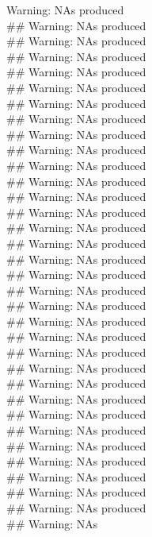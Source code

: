 \documentclass{article}\usepackage[]{graphicx}\usepackage[]{color}
\makeatletter
\newenvironment{kframe}{%
 \def\at@end@of@kframe{}%
 \ifinner\ifhmode%
  \def\at@end@of@kframe{\end{minipage}}%
  \begin{minipage}{\columnwidth}%
 \fi\fi%
 \def\FrameCommand##1{\hskip\@totalleftmargin \hskip-\fboxsep
 \colorbox{shadecolor}{##1}\hskip-\fboxsep
     \hskip-\linewidth \hskip-\@totalleftmargin \hskip\columnwidth}%
 \MakeFramed {\advance\hsize-\width
   \@totalleftmargin\z@ \linewidth\hsize
   \@setminipage}}%
 {\par\unskip\endMakeFramed%
 \at@end@of@kframe}
\newenvironment{knitrout}{}{} %
\makeatother
\begin{document}
\begin{knitrout}
\begin{kframe}
Warning: NAs produced\\\#\# Warning: NAs produced\\\#\# Warning: NAs produced\\\#\# Warning: NAs produced\\\#\# Warning: NAs produced\\\#\# Warning: NAs produced\\\#\# Warning: NAs produced\\\#\# Warning: NAs produced\\\#\# Warning: NAs produced\\\#\# Warning: NAs produced\\\#\# Warning: NAs produced\\\#\# Warning: NAs produced\\\#\# Warning: NAs produced\\\#\# Warning: NAs produced\\\#\# Warning: NAs produced\\\#\# Warning: NAs produced\\\#\# Warning: NAs produced\\\#\# Warning: NAs produced\\\#\# Warning: NAs produced\\\#\# Warning: NAs produced\\\#\# Warning: NAs produced\\\#\# Warning: NAs produced\\\#\# Warning: NAs produced\\\#\# Warning: NAs produced\\\#\# Warning: NAs produced\\\#\# Warning: NAs produced\\\#\# Warning: NAs produced\\\#\# Warning: NAs produced\\\#\# Warning: NAs produced\\\#\# Warning: NAs produced\\\#\# Warning: NAs produced\\\#\# Warning: NAs produced\\\#\# Warning: NAs produced\\\#\# Warning: NAs 
\end{kframe}
\end{knitrout}
\end{document}

